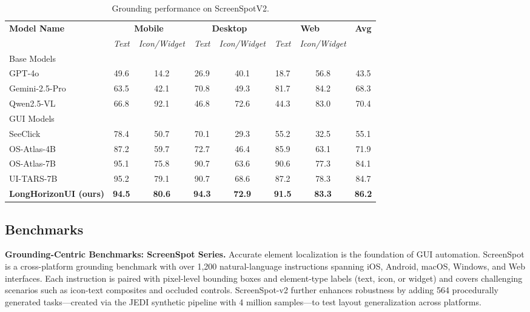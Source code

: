 \documentclass{article} %
\newcommand{\mypara}[1]{\vspace{0.4em}\noindent\textbf{#1}\hspace{0.2cm}}
\begin{document}
\begin{table}[t]
\centering
\caption{Grounding performance on ScreenSpotV2.}
\label{tab:ground_performance_2}
\footnotesize
\setlength{\tabcolsep}{3pt}
\begin{tabular}{lccccccc}
\toprule
\textbf{Model Name} &
\multicolumn{2}{c}{\textbf{Mobile}} &
\multicolumn{2}{c}{\textbf{Desktop}} &
\multicolumn{2}{c}{\textbf{Web}} &
\textbf{Avg} \\
\cmidrule(lr){2-3} \cmidrule(lr){4-5} \cmidrule(lr){6-7}
& \textit{Text} & \textit{Icon/Widget} & \textit{Text} & \textit{Icon/Widget} & \textit{Text} & \textit{Icon/Widget} & \\
\midrule
\multicolumn{8}{l}{Base Models} \\
\midrule
GPT-4o \citep{openai2024gpt4technicalreport}      & 49.6 & 14.2 & 26.9 & 40.1 & 18.7 & 56.8 & 43.5 \\
Gemini-2.5-Pro \citep{comanici2025gemini}         & 63.5 & 42.1 & 70.8 & 49.3 & 81.7 & 84.2 & 68.3 \\
Qwen2.5-VL \citep{Qwen2.5-VL}                     & 66.8 & 92.1 & 46.8 & 72.6 & 44.3 & 83.0 & 70.4 \\
\midrule
\multicolumn{8}{l}{GUI Models} \\
\midrule
SeeClick \citep{cheng_2024_seeclick}              & 78.4 & 50.7 & 70.1 & 29.3 & 55.2 & 32.5 & 55.1 \\
OS-Atlas-4B                  & 87.2 & 59.7 & 72.7 & 46.4 & 85.9 & 63.1 & 71.9 \\
OS-Atlas-7B \citep{wu2024osatlas}                 & 95.1 & 75.8 & 90.7 & 63.6 & 90.6 & 77.3 & 84.1 \\
UI-TARS-7B                                        & 95.2 & 79.1 & 90.7 & 68.6 & 87.2 & 78.3 & 84.7 \\
\midrule
\rowcolor{black!4}
\textbf{LongHorizonUI (ours)}                     & \textbf{94.5} & \textbf{80.6} & \textbf{94.3} & \textbf{72.9} & \textbf{91.5} & \textbf{83.3} & \textbf{86.2} \\
\bottomrule
\end{tabular}
\end{table}


\subsection{Benchmarks}
\label{sec:Benchmarks}

\mypara{Grounding-Centric Benchmarks: ScreenSpot Series.}
Accurate element localization is the foundation of GUI automation. ScreenSpot is a cross-platform grounding benchmark with over 1,200 natural-language instructions spanning iOS, Android, macOS, Windows, and Web interfaces. Each instruction is paired with pixel-level bounding boxes and element-type labels (text, icon, or widget) and covers challenging scenarios such as icon-text composites and occluded controls. ScreenSpot-v2 \citep{wu2024osatlasfoundationactionmodel} further enhances robustness by adding 564 procedurally generated tasks—created via the JEDI synthetic pipeline with 4 million samples—to test layout generalization across platforms.
\end{document}
